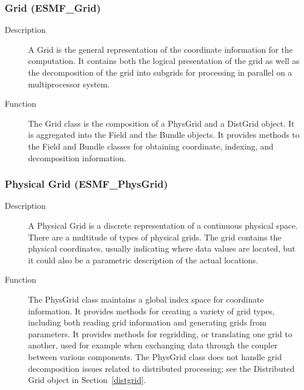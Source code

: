 \subsubsection{Grid (ESMF\_Grid)}
\label{sec:ordering} 
\begin{description}
\item [Description] A Grid is the general representation of the coordinate information for
the computation.  It contains both the logical presentation of the grid as well as the
decomposition of the grid into subgrids for processing in parallel on a
multiprocessor system.
\item [Function] The Grid class is the composition of a PhysGrid and a DistGrid object.  
It is aggregated into the Field and the Bundle objects.  It provides methods to the
Field and Bundle classes for obtaining coordinate, indexing, and decomposition information.
\end{description}

\subsubsection{Physical Grid (ESMF\_PhysGrid)}
\label{sec:physgrid} 
\begin{description}
\item [Description] A Physical Grid is a discrete representation of a continuous physical space.
There are a multitude of types of physical grids.
The grid contains the physical coordinates, usually indicating where data values are located, but
it could also be a parametric description of the actual locations.  
\item [Function] The PhysGrid class maintains a global index space for coordinate information.
It provides methods for creating a variety of grid types, including both reading grid information
and generating grids from parameters.  It provides methods for regridding, or translating
one grid to another, used for example when exchanging data through the coupler between
various components.
The PhysGrid class does not handle grid decomposition issues related to 
distributed processing; see the Distributed Grid object in Section~\ref{distgrid}.
\end{description}

